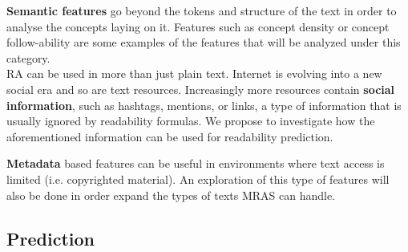 \documentclass[12pt]{article}
\begin{document}
\noindent
\textbf{Semantic features} go beyond the tokens and structure of the text in order to analyse the concepts laying on it. %
 Features such as concept density or concept follow-ability are some examples of the features that will be analyzed under this category.\\

\noindent
RA can be used in more than just plain text. Internet is evolving into a new social era and so are text resources. Increasingly more resources contain \textbf{social information}, such as hashtags, mentions, or links, a type of information that is usually ignored by readability formulas. We propose to investigate how the aforementioned information can be used for readability prediction.

\noindent
\textbf{Metadata} based features can be useful in environments where text access is limited (i.e. copyrighted material). An exploration of this type of features will also be done in order expand the types of texts MRAS can handle.






\subsection{Prediction}
\end{document}
